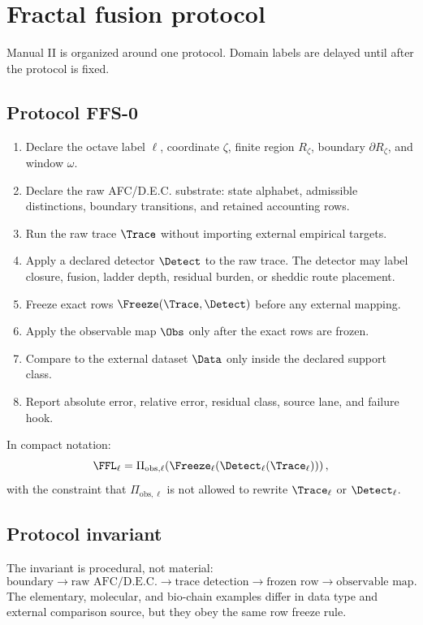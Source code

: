 \section{Fractal fusion protocol}

Manual II is organized around one protocol. Domain labels are delayed until after the protocol is fixed.

\subsection{Protocol FFS-0}

\begin{enumerate}[leftmargin=2.3em]
  \item Declare the octave label $\ell$, coordinate $\zeta$, finite region $R_\zeta$, boundary $\partial R_\zeta$, and window $\omega$.
  \item Declare the raw AFC/D.E.C. substrate: state alphabet, admissible distinctions, boundary transitions, and retained accounting rows.
  \item Run the raw trace $\Trace$ without importing external empirical targets.
  \item Apply a declared detector $\Detect$ to the raw trace. The detector may label closure, fusion, ladder depth, residual burden, or sheddic route placement.
  \item Freeze exact rows $\Freeze(\Trace,\Detect)$ before any external mapping.
  \item Apply the observable map $\Obs$ only after the exact rows are frozen.
  \item Compare to the external dataset $\Data$ only inside the declared support class.
  \item Report absolute error, relative error, residual class, source lane, and failure hook.
\end{enumerate}

In compact notation:
\[
\FFL_\ell = \Pi_{\mathrm{obs},\ell}\!\left(\Freeze_\ell\!\left(\Detect_\ell(\Trace_\ell)\right)\right),
\]
with the constraint that $\Pi_{\mathrm{obs},\ell}$ is not allowed to rewrite $\Trace_\ell$ or $\Detect_\ell$.

\subsection{Protocol invariant}

The invariant is procedural, not material:
\[
\text{boundary} \to \text{raw AFC/D.E.C.} \to \text{trace detection} \to \text{frozen row} \to \text{observable map}.
\]
The elementary, molecular, and bio-chain examples differ in data type and external comparison source, but they obey the same row freeze rule.

